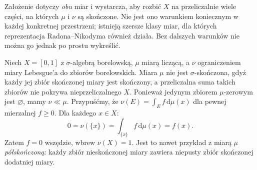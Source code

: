 \begin{uwaga}
Założenie dotyczy \emph{obu} miar i wystarcza, aby rozbić
$X$ na przeliczalnie wiele części, na których
$\mu$ i $\nu$ są skończone. Nie jest ono warunkiem
koniecznym w każdej konkretnej przestrzeni;
istnieją szersze klasy miar, dla których reprezentacja
Radona--Nikodyma również działa. Bez dalszych warunków
nie można go jednak po prostu wykreślić.
\end{uwaga}

\begin{przyklad}
\label{ex:RN-failure-nonsigma-18}
Niech $X=[0,1]$ z $\sigma$-algebrą borelowską,
$\mu$ miarą liczącą, a $\nu$ ograniczeniem miary
Lebesgue'a do zbiorów borelowskich. Miara $\mu$
nie jest $\sigma$-skończona, gdyż każdy jej zbiór
skończonej miary jest skończony, a przeliczalna suma
takich zbiorów nie pokrywa nieprzeliczalnego $X$.
Ponieważ jedynym zbiorem $\mu$-zerowym jest $\varnothing$,
mamy $\nu\ll\mu$. Przypuśćmy, że
$\nu(E)=\int_Ef\,\mathrm d\mu(x)$ dla pewnej
mierzalnej $f\ge0$. Dla każdego $x\in X$:
\[
0=\nu(\{x\})=\int_{\{x\}}f\,\mathrm d\mu(x)=f(x).
\]
Zatem $f=0$ wszędzie, wbrew
$\nu(X)=1$. Jest to nawet przykład z miarą $\mu$
\emph{półskończoną}: każdy zbiór nieskończonej miary
zawiera niepusty zbiór skończonej dodatniej miary.
\end{przyklad}

